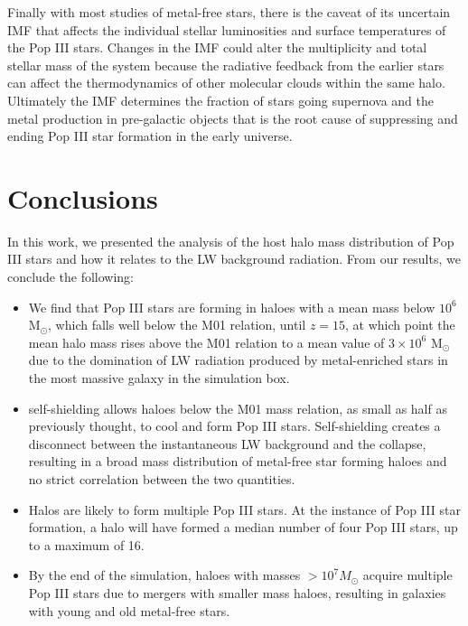 \documentclass[fleqn,usenatbib]{mnras}
\begin{document}
Finally with most studies of metal-free stars, there is the caveat of its uncertain IMF that affects the individual stellar luminosities and surface temperatures of the Pop III stars.  Changes in the IMF could alter the multiplicity and total stellar mass of the system because the radiative feedback from the earlier stars can affect the thermodynamics of other molecular clouds within the same halo.  Ultimately the IMF determines the fraction of stars going supernova and the metal production in pre-galactic objects that is the root cause of suppressing and ending Pop III star formation in the early universe.

\section{Conclusions}
In this work, we presented the analysis of the host halo mass distribution of Pop III stars and how it relates to the LW background radiation. From our results, we conclude the following: 

\begin{itemize}
	\item We find that Pop III stars are forming in haloes with a mean mass below $10^{6}$ M$_{\odot}$, which falls well below the M01 relation, until $z=15$, at which point the mean halo mass rises above the M01 relation to a mean value of $3 \times 10^{6}$ M$_{\odot}$ due to the domination of LW radiation produced by metal-enriched stars in the most massive galaxy in the simulation box.
	\item \hh{} self-shielding allows haloes below the M01 mass relation, as small as half as previously thought, to cool and form Pop III stars.  Self-shielding creates a disconnect between the instantaneous LW background and the collapse, resulting in a broad mass distribution of metal-free star forming haloes and no strict correlation between the two quantities.
	\item Halos are likely to form multiple Pop III stars. At the instance of Pop III star formation, a halo will have formed a median number of four Pop III stars, up to a maximum of 16.
	\item By the end of the simulation, haloes with masses $>10^{7} M_{\odot}$ acquire multiple Pop III stars due to mergers with smaller mass haloes, resulting in galaxies with young and old metal-free stars. 
\end{itemize}
\end{document}
